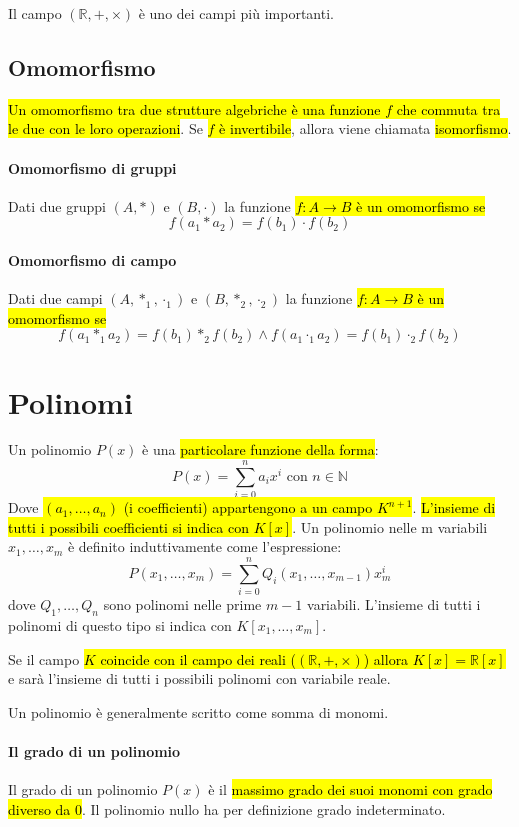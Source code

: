 Il campo $(\mathbb{R}, +, \times)$ è uno dei campi più importanti.

\subsection{Omomorfismo}
\hl{Un omomorfismo tra due strutture algebriche è una funzione $f$ che commuta
tra le due con le loro operazioni}. Se \hl{$f$ è invertibile}, allora viene
chiamata \hl{isomorfismo}.

\paragraph{Omomorfismo di gruppi} Dati due gruppi $(A, \ast)$ e $(B, \cdot)$ la
funzione \hl{$f: A \to B$ è un omomorfismo se}
\[
    f(a_1 \ast a_2) = f(b_1) \cdot f(b_2)
\]

\paragraph{Omomorfismo di campo} Dati due campi $(A, \ast_1, \cdot_1)$ e
$(B, \ast_2, \cdot_2)$ la funzione \hl{$f: A \to B$ è un omomorfismo se}
\[
    f(a_1 \ast_1 a_2) = f(b_1) \ast_2 f(b_2) \wedge
        f(a_1 \cdot_1 a_2) = f(b_1) \cdot_2 f(b_2)
\]

\section{Polinomi}
Un polinomio $P(x)$ è una \hl{particolare funzione della forma}:
\[
    P(x) = \sum_{i=0}^{n} a_i x^i \text{ con } n \in \mathbb{N}
\]
Dove \hl{$(a_1, \ldots, a_n)$ (i coefficienti) appartengono a un campo $K^{n+1}$}.
\hl{L'insieme di tutti i possibili coefficienti si indica con $K[x]$}.
Un polinomio nelle m variabili $x_1, \dots ,x_m$ è definito induttivamente come
l’espressione:
\[
    P(x_1, \ldots, x_m) = \sum_{i=0}^n Q_i(x_1, \ldots, x_{m-1})x_m^i
\]
dove $Q_1, \ldots, Q_n$ sono polinomi nelle prime $m - 1$ variabili. L’insieme
di tutti i polinomi di questo tipo si indica con $K[x_1, \ldots, x_m]$.

Se il campo \hl{$K$ coincide con il campo dei reali ($(\mathbb{R}, +, \times)$)
allora $K[x] = \mathbb{R}[x]$} e sarà l'insieme di tutti i possibili polinomi
con variabile reale.

Un polinomio è generalmente scritto come somma di monomi.

\paragraph{Il grado di un polinomio} Il grado di un polinomio $P(x)$ è il
\hl{massimo grado dei suoi monomi con grado diverso da 0}. Il polinomio nullo
ha per definizione grado indeterminato.

